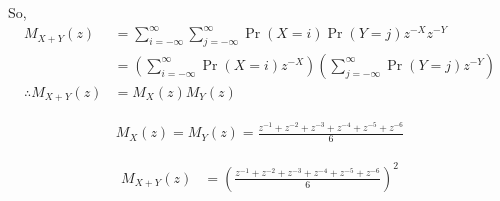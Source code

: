 \documentclass[journal,12pt,twocolumn]{IEEEtran}
\providecommand{\pr}[1]{\ensuremath{\Pr\left(#1\right)}}
\providecommand{\brak}[1]{\ensuremath{\left(#1\right)}}
\theoremstyle{remark}
\begin{document}
 So,
  \begin{align}
     M_{X+Y}(z) &= \sum_{i = -\infty}^{\infty}\sum_{j = -\infty}^{\infty} \pr{X = i }\pr{ Y =j }z^{-X}z^{-Y}\\
                &= \brak{\sum_{i = -\infty}^{\infty}\pr{X =i}z^{-X}}\brak{\sum_{j = -\infty}^{\infty}\pr{Y =j}z^{-Y}}\\
      \therefore  M_{X+Y}(z)        &= M_{X}(z)M_{Y}(z)
 \end{align}


\begin{align}
    M_{X}(z) = M_{Y}(z) = \frac{z^{-1}+z^{-2}+z^{-3}+z^{-4}+z^{-5}+z^{-6}}{6}
\end{align}

\begin{align}
    M_{X+Y}(z)&= \brak{\frac{z^{-1}+z^{-2}+z^{-3}+z^{-4}+z^{-5}+z^{-6}}{6}}^{2}
\end{align}
\end{document}
